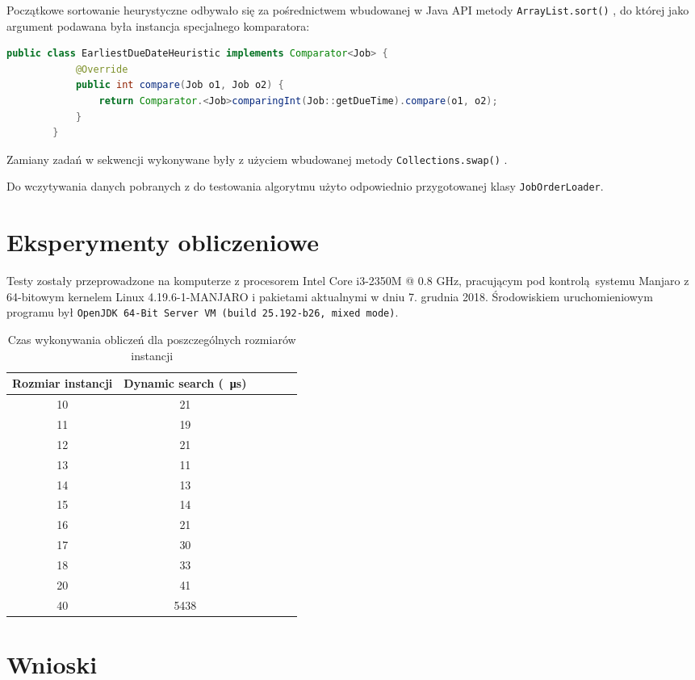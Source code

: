 \documentclass[polish,polish,a4paper]{article}
\begin{document}
	Początkowe sortowanie heurystyczne odbywało się za pośrednictwem wbudowanej w Java API metody\newline
	\texttt{ArrayList.sort()} \cite{JavaDocs}, do której jako argument podawana była instancja specjalnego komparatora:
	
	\begin{lstlisting}[language=Java]
		public class EarliestDueDateHeuristic implements Comparator<Job> {
			@Override
			public int compare(Job o1, Job o2) {
				return Comparator.<Job>comparingInt(Job::getDueTime).compare(o1, o2);
			}
		}
	\end{lstlisting}
	
	Zamiany zadań w sekwencji wykonywane były z użyciem wbudowanej metody \texttt{Collections.swap()} \cite{JavaDocs}.
	
	Do wczytywania danych pobranych z \cite{ORLib} do testowania algorytmu użyto odpowiednio przygotowanej klasy \texttt{JobOrderLoader}.
	
	
\section{Eksperymenty obliczeniowe}
	
	Testy zostały przeprowadzone na komputerze z procesorem Intel Core i3-2350M @ 0.8  GHz, pracującym pod kontrolą systemu Manjaro z 64-bitowym kernelem Linux 4.19.6-1-MANJARO i pakietami aktualnymi w dniu 7. grudnia 2018. Środowiskiem uruchomieniowym programu był \texttt{OpenJDK 64-Bit Server VM (build 25.192-b26, mixed mode)}.
	
	\begin{table}[h!]
		\centering
		\caption{Czas wykonywania obliczeń dla poszczególnych rozmiarów instancji}
		\label{tab:result}
		{\begin{tabular}{cccccc}
			\hline
			Rozmiar instancji & Dynamic search (\SI{}{\micro\second}) \\
			\hline
	        10 & 21 \\
			11 & 19 \\
			12 & 21 \\
			13 & 11 \\
			14 & 13 \\
			15 & 14 \\
			16 & 21 \\
			17 & 30 \\
			18 & 33 \\
			20 & 41 \\
			40 & 5438 \\
			\hline
		\end{tabular}}
	\end{table}
	
\section{Wnioski}
	
	
	


\end{document}
